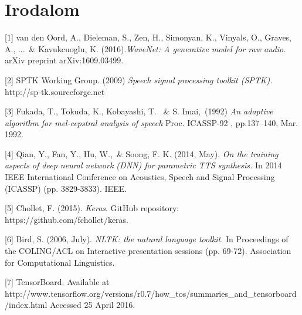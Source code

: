 \section*{Irodalom}



\small


\label{ref_1}[1] van den Oord, A., Dieleman, S., Zen, H., Simonyan, K., Vinyals, O., Graves, A., ...\ \& Kavukcuoglu, K. (2016).{\it WaveNet: A generative model for raw audio.} arXiv preprint arXiv:1609.03499.

\label{ref_2}[2] SPTK Working Group. (2009) {\it Speech signal processing toolkit (SPTK).} http://sp-tk.sourceforge.net

\label{ref_3}[3] Fukada, T., Tokuda, K., Kobayashi, T. \ \& S. Imai,\ (1992) {\it An adaptive algorithm for mel-cepstral 
analysis of speech} Proc. ICASSP-92 , pp.137–140, Mar. 1992.

\label{ref_4}[4] Qian, Y., Fan, Y., Hu, W.,\ \& Soong, F. K. (2014, May). {\it On the training aspects of deep neural network (DNN) for parametric TTS synthesis.} In 2014 IEEE International Conference on Acoustics, Speech and Signal Processing (ICASSP) (pp. 3829-3833). IEEE.

\label{ref_5}[5] Chollet, F. (2015). {\it Keras}. GitHub repository: https://github.com/fchollet/keras.

\label{ref_6}[6] Bird, S. (2006, July). {\it NLTK: the natural language toolkit.} In Proceedings of the COLING/ACL on Interactive presentation sessions (pp. 69-72). Association for Computational Linguistics.

\label{ref_7}[7] TensorBoard. Available at \\ http://www.tensorflow.org/versions/r0.7/how\_tos/summaries\_and\_tensorboard/index.html Accessed 25 April 2016.